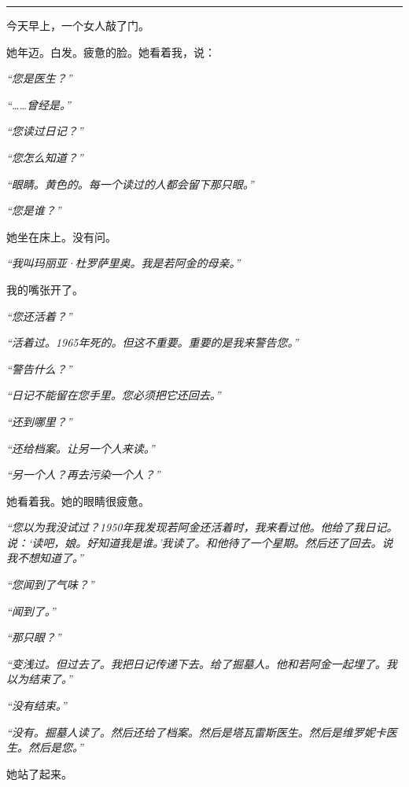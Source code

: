 \vspace{0.5em}\noindent\rule{\textwidth}{0.5pt}\vspace{0.5em}

\noindent 今天早上，一个女人敲了门。

\noindent 她年迈。白发。疲惫的脸。她看着我，说：

\noindent \textit{“您是医生？”}

\noindent \textit{“……曾经是。”}

\noindent \textit{“您读过日记？”}

\noindent \textit{“您怎么知道？”}

\noindent \textit{“眼睛。黄色的。每一个读过的人都会留下那只眼。”}

\noindent \textit{“您是谁？”}

\noindent 她坐在床上。没有问。

\noindent \textit{“我叫玛丽亚·杜罗萨里奥。我是若阿金的母亲。”}

\noindent 我的嘴张开了。

\noindent \textit{“您还活着？”}

\noindent \textit{“活着过。1965年死的。但这不重要。重要的是我来警告您。”}

\noindent \textit{“警告什么？”}

\noindent \textit{“日记不能留在您手里。您必须把它还回去。”}

\noindent \textit{“还到哪里？”}

\noindent \textit{“还给档案。让另一个人来读。”}

\noindent \textit{“另一个人？再去污染一个人？”}

\noindent 她看着我。她的眼睛很疲惫。

\noindent \textit{“您以为我没试过？1950年我发现若阿金还活着时，我来看过他。他给了我日记。说：‘读吧，娘。好知道我是谁。’我读了。和他待了一个星期。然后还了回去。说我不想知道了。”}

\noindent \textit{“您闻到了气味？”}

\noindent \textit{“闻到了。”}

\noindent \textit{“那只眼？”}

\noindent \textit{“变浅过。但过去了。我把日记传递下去。给了掘墓人。他和若阿金一起埋了。我以为结束了。”}

\noindent \textit{“没有结束。”}

\noindent \textit{“没有。掘墓人读了。然后还给了档案。然后是塔瓦雷斯医生。然后是维罗妮卡医生。然后是您。”}

\noindent 她站了起来。


